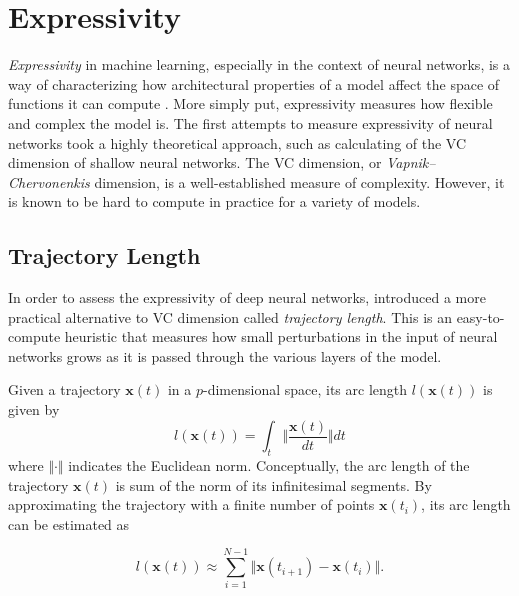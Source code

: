 \section{Expressivity}\label{sec:Expressivity}
\emph{Expressivity} in machine learning, especially in the context of neural networks, is a way of characterizing how architectural properties of a model affect the space of functions it can compute \citet{raghu2017expressive}. More simply put, expressivity measures how flexible and complex the model is. The first attempts to measure expressivity of neural networks took a highly theoretical approach, such as \citet{Bartlett} calculating of the VC dimension of shallow neural networks. The VC dimension, or \emph{Vapnik–Chervonenkis} dimension\cite{hastie01statisticallearning}, is a well-established measure of complexity. However, it is known to be hard to compute in practice for a variety of models\cite{abbas2020power}.  

\subsection{Trajectory Length}\label{sec:TrajectoryLength}
In order to assess the expressivity of deep neural networks, \citet{raghu2017expressive} introduced a more practical alternative to VC dimension called \emph{trajectory length}. This is an easy-to-compute heuristic that measures how small perturbations in the input of neural networks grows as it is passed through the various layers of the model. 

Given a trajectory $\boldsymbol{x}(t)$ in a $p$-dimensional space, its arc length 
$l(\boldsymbol{x}(t))$ is given by
\begin{equation}
   l(\boldsymbol{x}(t)) = 
   \int_{t} \big\Vert \frac{\boldsymbol{x}(t)}{dt} \big\Vert dt
\end{equation}
where $\Vert \cdot\Vert$ indicates the Euclidean norm. Conceptually, the arc length of the trajectory $\boldsymbol{x}(t)$ is sum of the norm of its infinitesimal segments. By approximating the trajectory with a finite number of points $\boldsymbol{x}(t_i)$, its arc length can be estimated as 

\begin{equation}\label{eq:TrajectoryLengthDiscrete}
   l(\boldsymbol{x}(t)) \approx 
   \sum_{i=1}^{N-1} \Vert\boldsymbol{x}(t_{i+1}) - \boldsymbol{x}(t_{i})\Vert.
\end{equation}

